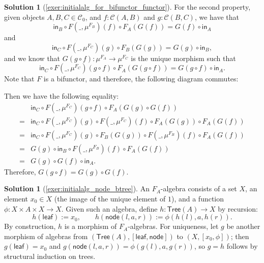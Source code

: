 \documentclass[a4paper,11pt, oneside,titlepage=false]{scrbook}
\theoremstyle{plain}
\theoremstyle{definition}
\newtheorem{solution}[thm]{Solution}
\newcommand{\Cat}[1]{\mathcal{#1}}
\newcommand{\CC}{\Cat{C}}
\newcommand{\Ob}[1]{{#1}_0}
\newcommand{\Initalg}[1]{\ensuremath{\mu^{#1}}}
\newcommand{\In}{\ensuremath{\mathsf{in}}}
\begin{document}
\begin{solution}[\cref{exer:initialalg_for_bifunctor_functor}]
	For the second property, given objects $ A, B, C \in \Ob \CC $, and $ f: \CC(A, B) $ and $ g: \CC(B, C) $, we have that
	\[ \In_B \circ F(\_, \Initalg{F_B})(f) \circ F_A(G(f)) = G(f) \circ \In_A \]
	and
	\[ \In_C \circ F(\_, \Initalg{F_C})(g) \circ F_B(G(g)) = G(g) \circ \In_B, \]
	and we know that $ G(g \circ f): \Initalg{F_A} \to \Initalg{F_C} $ is the unique morphism such that
	\[ \In_C \circ F(\_, \Initalg{F_C})(g \circ f) \circ F_A(G(g \circ f)) = G(g \circ f) \circ \In_A. \]
	Note that $ F $ is a bifunctor, and therefore, the following diagram commutes:
	\begin{center}
	\end{center}
	Then we have the following equality:
	\begin{align*}
		& \In_C \circ F(\_, \Initalg{F_C})(g \circ f) \circ F_A(G(g) \circ G(f))\\
		=& \In_C \circ F(\_, \Initalg{F_C})(g) \circ F(\_, \Initalg{F_C})(f) \circ F_A(G(g)) \circ F_A(G(f))\\
		=& \In_C \circ F(\_, \Initalg{F_C})(g) \circ F_B(G(g)) \circ F(\_, \Initalg{F_B})(f) \circ F_A(G(f))\\
		=& G(g) \circ \In_B \circ F(\_, \Initalg{F_B})(f) \circ F_A(G(f))\\
		=& G(g) \circ G(f) \circ \In_A.
	\end{align*}
	Therefore, $ G(g \circ f) = G(g) \circ G(f) $.
\end{solution}

\begin{solution}[\cref{exer:initialalg_node_btree}]\label{sol:initialalg_node_btree}
  An $F_A$-algebra consists of a set $X$, an element $x_0 \in X$
  (the image of the unique element of $1$), and a function
  $\phi : X \times A \times X \to X$.
  Given such an algebra, define $h : \mathsf{Tree}(A) \to X$ by recursion:
  \[
  h(\mathsf{leaf}) := x_0,
  \qquad
  h(\mathsf{node}(l, a, r)) := \phi(h(l), a, h(r)).
  \]
  By construction, $h$ is a morphism of $F_A$-algebras.
  For uniqueness, let $g$ be another morphism of algebras from
  $(\mathsf{Tree}(A), [\mathsf{leaf}, \mathsf{node}])$ to $(X, [x_0, \phi])$;
  then $g(\mathsf{leaf}) = x_0$ and
  $g(\mathsf{node}(l,a,r)) = \phi(g(l), a, g(r))$, so $g = h$ follows by
  structural induction on trees.
\end{solution}
\end{document}
